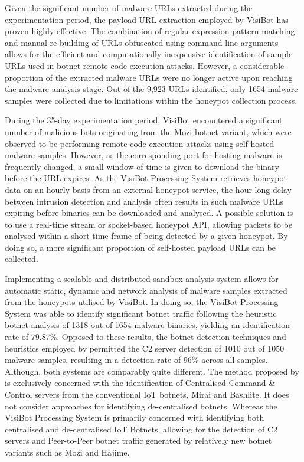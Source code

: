 Given the significant number of malware URLs extracted during the experimentation period, the payload URL extraction employed by VisiBot has proven highly effective. The combination of regular expression pattern matching and manual re-building of URLs obfuscated using command-line arguments allows for the efficient and computationally inexpensive identification of sample URLs used in botnet remote code execution attacks. However, a considerable proportion of the extracted malware URLs were no longer active upon reaching the malware analysis stage. Out of the 9,923 URLs identified, only 1654 malware samples were collected due to limitations within the honeypot collection process.

During the 35-day experimentation period, VisiBot encountered a significant number of malicious bots originating from the Mozi botnet variant, which were observed to be performing remote code execution attacks using self-hosted malware samples. However, as the corresponding port for hosting malware is frequently changed, a small window of time is given to download the binary before the URL expires. As the VisiBot Processing System retrieves honeypot data on an hourly basis from an external honeypot service, the hour-long delay between intrusion detection and analysis often results in such malware URLs expiring before binaries can be downloaded and analysed. A possible solution is to use a real-time stream or socket-based honeypot API, allowing packets to be analysed within a short time frame of being detected by a given honeypot. By doing so, a more significant proportion of self-hosted payload URLs can be collected.

Implementing a scalable and distributed sandbox analysis system allows for automatic static, dynamic and network analysis of malware samples extracted from the honeypots utilised by VisiBot. In doing so, the VisiBot Processing System was able to identify significant botnet traffic following the heuristic botnet analysis of 1318 out of 1654 malware binaries, yielding an identification rate of 79.87\%. Opposed to these results, the botnet detection techniques and heuristics employed by \citet{Bastos2019} permitted the C2 server detection of 1010 out of 1050 malware samples, resulting in a detection rate of 96\% across all samples. Although, both systems are comparably quite different.  The method proposed by \citet{Bastos2019} is exclusively concerned with the identification of Centralised Command \& Control servers from the conventional IoT botnets, Mirai and Bashlite. It does not consider approaches for identifying de-centralised botnets. Whereas the VisiBot Processing System is primarily concerned with identifying both centralised and de-centralised IoT Botnets, allowing for the detection of C2 servers and Peer-to-Peer botnet traffic generated by relatively new botnet variants such as Mozi and Hajime.

